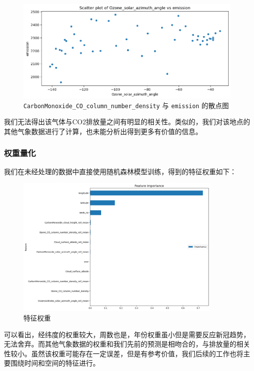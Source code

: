 \documentclass{ctexart}
\begin{document}
\begin{figure}[H]
      \centering
      \includegraphics[width=1\textwidth]{output7.png}
      \caption{\texttt{CarbonMonoxide\_CO\_column\_number\_density} 与 \texttt{emission} 的散点图}
      \label{fig:7}
\end{figure}

我们无法得出该气体与CO2排放量之间有明显的相关性。类似的，我们对该地点的其他气象数据进行了计算，也未能分析出得到更多有价值的信息。

\subsubsection{权重量化}

我们在未经处理的数据中直接使用随机森林模型训练，得到的特征权重如下：

\begin{figure}[H]
      \centering
      \includegraphics[width=0.9\textwidth]{output11.png}
      \caption{特征权重}
      \label{fig:11}
\end{figure}

可以看出，经纬度的权重较大，周数也是，年份权重虽小但是需要反应新冠趋势，无法舍弃。而其他气象数据的权重和我们先前的预测是相吻合的，与排放量的相关性较小。虽然该权重可能存在一定误差，但是有参考价值，我们后续的工作也将主要围绕时间和空间的特征进行。
\end{document}
